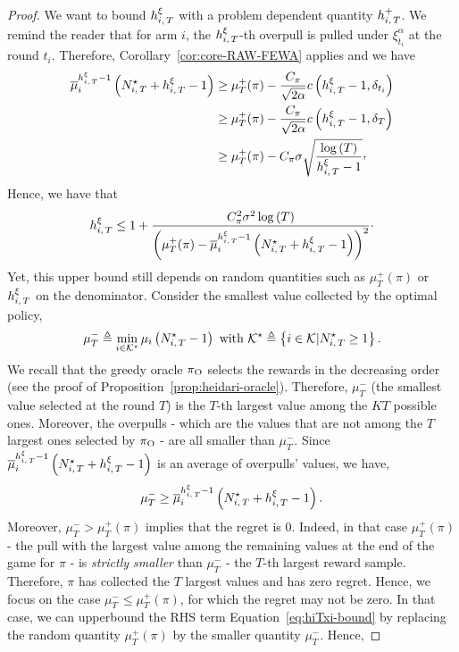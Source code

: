 \begin{proof}

We want to bound $h_{i,\,T}^\xi $ with a problem dependent quantity $h_{i,\,T}^+$. We remind the reader that for arm $i$, the $h_{i,\,T}^\xi$-th overpull is pulled under $\xi^\alpha_{t_i}$ at the round $t_i$. Therefore, Corollary~\ref{cor:core-RAW-FEWA} applies and we have
\begin{align*}
\bmu_i^{\hiT^\xi  - 1} \left( \NiT^\star + \hiT^\xi   - 1 \right) &\geq \mu_T^+(\pi) - \frac{C_\pi}{\sqrt{2\alpha}} c\pa{\hiT^\xi   - 1, \delta_{t_i}}
\\& \geq \mu_T^+(\pi) - \frac{C_\pi}{\sqrt{2\alpha}} c\pa{\hiT^\xi   - 1, \delta_T}
\\& \geq \mu_T^+(\pi) - C_\pi \sigma \sqrt{\frac{\log\pa{T}}{\hiT^\xi-1}}\CommaBin
\end{align*}
Hence, we have that 
\begin{equation}
\label{eq:hiTxi-bound}
h_{i,\,T}^\xi \leq 1 + \frac{C_\pi^2 \sigma^2\log\left(T\right)}{\left(\mu_T^+(\pi)- \overline{\mu}_i^{h_{i,\,T}^\xi  - 1} \left( N_{i,\,T}^\star + h_{i,\,T}^\xi   - 1 \right) \right)^2 }\cdot
\end{equation}
%
Yet, this upper bound still depends on random quantities such as $\mu_T^+(\pi)$ or $h_{i,\,T}^\xi$ on the denominator. 
Consider the smallest value collected by the optimal policy, 
\[
\mu^-_T\triangleq \min_{i \in \mathcal{K}^\star} \mu_i \left(N_{i,\,T}^\star -1\right)\text{ with } \mathcal{K}^\star \triangleq\left\{ i \in \mathcal{K} | N_{i,\,T}^\star \geq 1 \right\}.
\]
We recall that the greedy oracle $\pi_{\rm O}$ selects the rewards in the decreasing order (see the proof of Proposition~\ref{prop:heidari-oracle}). Therefore, $\mu^-_T$ (the smallest value selected at the round $T$) is the $T$-th largest value among the $KT$ possible ones. Moreover, the overpulls - which are the values that are not among the $T$ largest ones selected by $\pi_{\rm O}$ - are all smaller than $\mu^-_T$. Since $\overline{\mu}_i^{h_{i,\,T}^\xi  - 1} \left( N_{i,\,T}^\star + h_{i,\,T}^\xi  - 1 \right)$ is an average of overpulls' values, we have,
\[\mu^-_T\geq \overline{\mu}_i^{h_{i,\,T}^\xi  - 1} \left( N_{i,\,T}^\star + h_{i,\,T}^\xi   - 1 \right).\] 
%
Moreover, $\mu_T^- > \mu_T^+(\pi)$ implies that the regret is 0. Indeed, in that case $\mu_T^+(\pi)$ - the pull with the largest value among the remaining values at the end of the game for $\pi$ - is \emph{strictly smaller} than $\mu_T^-$ - the $T$-th largest reward sample.  Therefore, $\pi$ has collected the $T$ largest values and has zero regret. Hence, we focus on the case $\mu^-_T\leq \mu^+_T(\pi)$, for which the regret may not be zero.  In that case, we can upperbound the RHS term Equation~\ref{eq:hiTxi-bound} by replacing the random quantity $\mu_T^+(\pi)$ by the smaller quantity $\mu^-_T$. Hence, 

\end{proof}
